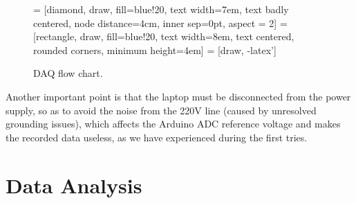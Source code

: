 \documentclass[12pt]{article}
\begin{document}
\begin{figure}[H]
\centering
 = [diamond, draw, fill=blue!20, 
    text width=7em, text badly centered, node distance=4cm, inner sep=0pt, aspect = 2]
 = [rectangle, draw, fill=blue!20, 
    text width=8em, text centered, rounded corners, minimum height=4em]
 = [draw, -latex']
\caption{DAQ flow chart.}
\end{figure}
Another important point is that the laptop must be disconnected from the power supply, so as to avoid the noise from the 220V line (caused by unresolved grounding issues), which affects the Arduino ADC reference voltage and makes the recorded data useless, as we have experienced during the first tries. 
\section{Data Analysis}
\end{document}
